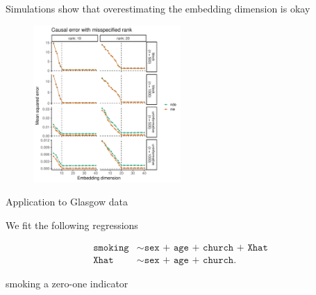\documentclass[aspectratio=169]{beamer}
\theoremstyle{remark}
\begin{document}
\begin{frame}{Simulations show that overestimating the embedding dimension is okay}
    \centering
    \begin{figure}
        \includegraphics[width=0.5\textwidth]{figures/misspecification/loss_average.pdf}
    \end{figure}
\end{frame}

\begin{frame}{Application to Glasgow data}

    We fit the following regressions

    \begin{equation*}
        \begin{aligned}
            \texttt{smoking} & \sim \texttt{sex + age + church + Xhat} \\
            \texttt{Xhat}    & \sim \texttt{sex + age + church}.
        \end{aligned}
    \end{equation*}

    smoking a zero-one indicator
\end{frame}
\end{document}
